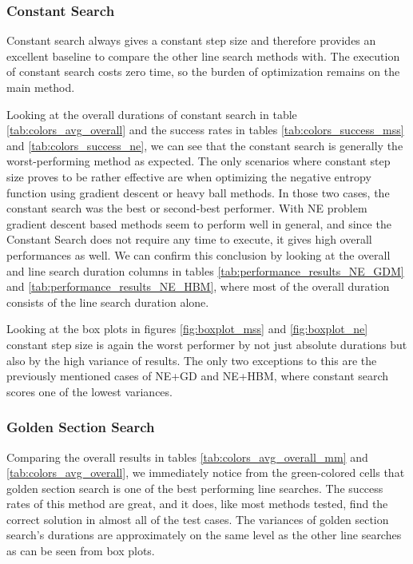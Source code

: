\documentclass[a4paper,english,titlepage,12pt]{article}
\begin{document}


\subsubsection*{Constant Search}


Constant search always gives a constant step size and therefore provides an excellent baseline to compare the other line search methods with. The execution of constant search costs zero time, so the burden of optimization remains on the main method.

Looking at the overall durations of constant search in table \ref{tab:colors_avg_overall} and the success rates in tables \ref{tab:colors_success_mss} and \ref{tab:colors_success_ne}, we can see that the constant search is generally the worst-performing method as expected. The only scenarios where constant step size proves to be rather effective are when optimizing the negative entropy function using gradient descent or heavy ball methods. In those two cases, the constant search was the best or second-best performer. With NE problem gradient descent based methods seem to perform well in general, and since the Constant Search does not require any time to execute, it gives high overall performances as well. We can confirm this conclusion by looking at the overall and line search duration columns in tables \ref{tab:performance_results_NE_GDM} and \ref{tab:performance_results_NE_HBM}, where most of the overall duration consists of the line search duration alone.

Looking at the box plots in figures \ref{fig:boxplot_mss} and \ref{fig:boxplot_ne} constant step size is again the worst performer by not just absolute durations but also by the high variance of results. The only two exceptions to this are the previously mentioned cases of NE+GD and NE+HBM, where constant search scores one of the lowest variances.

\subsubsection*{Golden Section Search}

Comparing the overall results in tables \ref{tab:colors_avg_overall_mm} and \ref{tab:colors_avg_overall}, we immediately notice from the green-colored cells that golden section search is one of the best performing line searches. The success rates of this method are great, and it does, like most methods tested, find the correct solution in almost all of the test cases. The variances of golden section search's durations are approximately on the same level as the other line searches as can be seen from box plots.
\end{document}
